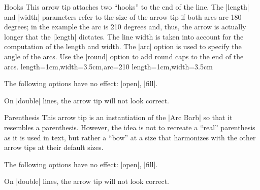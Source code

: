 \begin{arrowtip}{Hooks}
  {
    This arrow tip attaches two ``hooks'' to the end of the line. The
    |length| and |width| parameters refer to the size of the arrow tip
    if both arcs are 180 degrees; in the example the arc is 210
    degrees and, thus, the arrow is actually longer that the |length|
    dictates. The line width is taken into account for the computation
    of the length and width. The |arc| option is used to specify the
    angle of the arcs. Use the |round| option to add round caps to the
    end of the arcs.
  }
  {length=1cm,width=3.5cm,arc=210}
  {length=1cm,width=3.5cm}
  
  \begin{arrowexamples}
    \arrowexample[]
    \arrowexampledup[sep]
    \arrowexampledupdot[sep]
    \arrowexample[arc=120]
    \arrowexample[arc=270]
    \arrowexample[length=2pt]
    \arrowexample[length=2pt,width=5pt]
    \arrowexample[line width=2pt]
    \arrowexample[reversed]
    \arrowexample[round]
    \arrowexample[slant=.3]
    \arrowexample[left]
    \arrowexample[right]
    \arrowexample[red]
  \end{arrowexamples}
  The following options have no effect: |open|, |fill|.

  On |double| lines, the arrow tip will not look correct.
\end{arrowtip}


\begin{arrowtip}{Parenthesis}
  {
    This arrow tip is an instantiation of the |Arc Barb| so that it
    resembles a parenthesis. However, the idea is not to recreate a
    ``real'' parenthesis as it is used in text, but rather a ``bow''
    at a size that harmonizes with the other arrow tips at their
    default sizes.
  }
  {}
  {}
  
  \begin{arrowexamples}
    \arrowexample[]
    \arrowexampledup[sep]
    \arrowexampledupdot[sep]
    \arrowexample[reversed]
    \arrowexample[round]
    \arrowexample[slant=.3]
    \arrowexample[left]
    \arrowexample[right]
    \arrowexample[red]
  \end{arrowexamples}
  The following options have no effect: |open|, |fill|.

  On |double| lines, the arrow tip will not look correct.
\end{arrowtip}

